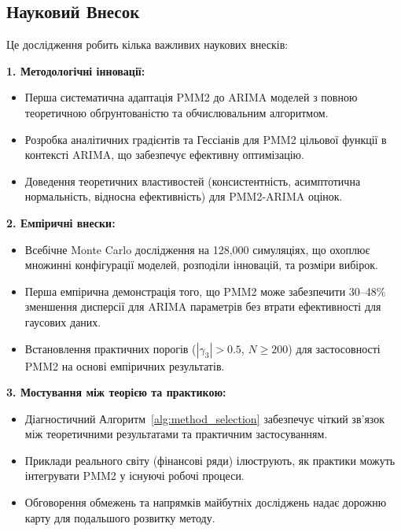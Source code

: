 \documentclass[12pt,a4paper]{article}
\begin{document}
\subsection{Науковий Внесок}
\label{subsec:scientific_contribution}

Це дослідження робить кілька важливих наукових внесків:

\textbf{1. Методологічні інновації:}

\begin{itemize}
    \item Перша систематична адаптація PMM2 до ARIMA моделей з повною теоретичною обґрунтованістю та обчислювальним алгоритмом.

    \item Розробка аналітичних градієнтів та Гессіанів для PMM2 цільової функції в контексті ARIMA, що забезпечує ефективну оптимізацію.

    \item Доведення теоретичних властивостей (консистентність, асимптотична нормальність, відносна ефективність) для PMM2-ARIMA оцінок.
\end{itemize}

\textbf{2. Емпіричні внески:}

\begin{itemize}
    \item Всебічне Monte Carlo дослідження на 128,000 симуляціях, що охоплює множинні конфігурації моделей, розподіли інновацій, та розміри вибірок.

    \item Перша емпірична демонстрація того, що PMM2 може забезпечити 30--48\% зменшення дисперсії для ARIMA параметрів без втрати ефективності для гаусових даних.

    \item Встановлення практичних порогів ($|\gamma_3| > 0.5$, $N \geq 200$) для застосовності PMM2 на основі емпіричних результатів.
\end{itemize}

\textbf{3. Мостування між теорією та практикою:}

\begin{itemize}
    \item Діагностичний Алгоритм~\ref{alg:method_selection} забезпечує чіткий зв'язок між теоретичними результатами та практичним застосуванням.

    \item Приклади реального світу (фінансові ряди) ілюструють, як практики можуть інтегрувати PMM2 у існуючі робочі процеси.

    \item Обговорення обмежень та напрямків майбутніх досліджень надає дорожню карту для подальшого розвитку методу.
\end{itemize}
\end{document}
